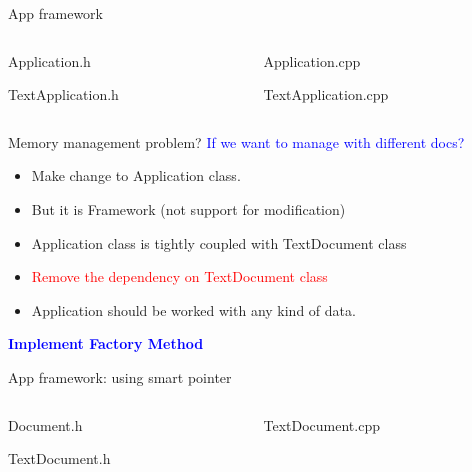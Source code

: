 \documentclass[13pt]{beamer}
\begin{document}
\begin{frame}{App framework}
\begin{columns}[T]
\begin{column}{.45\textwidth}
\lstset{basicstyle=\tiny,style=myCustomCppStyle}
Application.h

TextApplication.h

\end{column}

\begin{column}{.45\textwidth}
\lstset{basicstyle=\tiny,style=myCustomCppStyle}
Application.cpp

TextApplication.cpp

\end{column}
\end{columns}
\end{frame}

\begin{frame}{Memory management problem?}
	\textcolor{blue}{If we want to manage with different docs?}	
	\begin{itemize}
		\setlength\itemsep{1em}
		\item Make change to Application class.
		\item But it is Framework (not support for modification)
		\item Application class is tightly coupled with TextDocument class
		\item \textcolor{red}{Remove the dependency on TextDocument class}
		\item Application should be worked with any kind of data.
	\end{itemize}
	\begin{center}
	\textcolor{blue}{\textbf{Implement Factory Method}}
	\end{center}
\end{frame}

\begin{frame}{App framework: using smart pointer}
\begin{columns}[T]
\begin{column}{.45\textwidth}
\lstset{basicstyle=\tiny,style=myCustomCppStyle}
Document.h

TextDocument.h

\end{column}

\begin{column}{.45\textwidth}
\lstset{basicstyle=\tiny,style=myCustomCppStyle}
TextDocument.cpp

\end{column}
\end{columns}
\end{frame}
\end{document}
